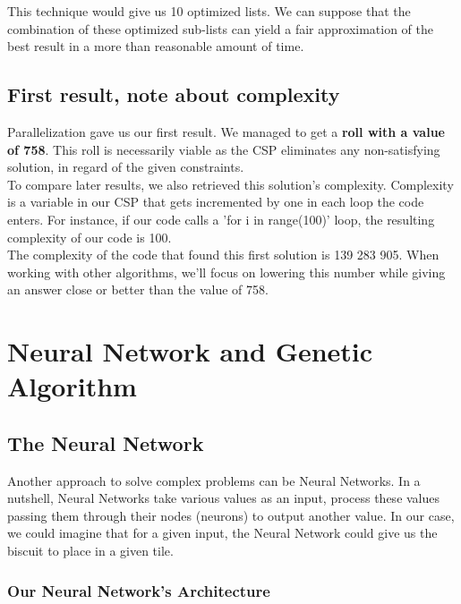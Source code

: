 \documentclass{modeleRapport}
\begin{document}
This technique would give us 10 optimized lists. We can suppose that the combination of 
these optimized sub-lists can yield a fair approximation of the best result in a more than reasonable amount of time.


\subsection{First result, note about complexity}


Parallelization gave us our first result. We managed to get a  \textbf{roll with a value of 758}. 
This roll is necessarily viable as the CSP eliminates any non-satisfying solution, in regard of the given constraints.\\

To compare later results, we also retrieved this solution's complexity. 
Complexity is a variable in our CSP that gets incremented by one in each loop the code enters. For instance, 
if our code calls a 'for i in range(100)' loop, the resulting complexity of our code is 100.\\

The complexity of the code that found this first solution is 139 283 905. 
When working with other algorithms, we'll focus on lowering this number while giving an answer close or better 
than the value of 758.\\

\newpage

\section{Neural Network and Genetic Algorithm}

\subsection{The Neural Network}

Another approach to solve complex problems can be Neural Networks. In a nutshell, Neural Networks take various values
as an input, process these values passing them through their nodes (neurons) to output another value. In our case,
we could imagine that for a given input, the Neural Network could give us the biscuit to place in a given tile.

\subsubsection{Our Neural Network's Architecture}
\end{document}
